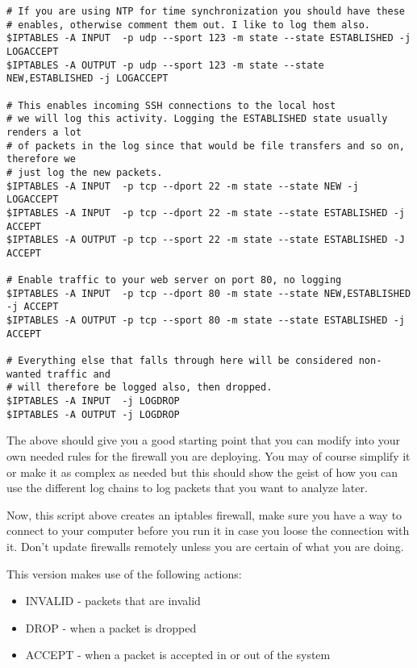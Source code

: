 \documentclass[english,twoside,openright,a4paper,12pt]{article}
\begin{document}
\begin{verbatim}
# If you are using NTP for time synchronization you should have these
# enables, otherwise comment them out. I like to log them also.
$IPTABLES -A INPUT  -p udp --sport 123 -m state --state ESTABLISHED -j LOGACCEPT 
$IPTABLES -A OUTPUT -p udp --sport 123 -m state --state NEW,ESTABLISHED -j LOGACCEPT

# This enables incoming SSH connections to the local host
# we will log this activity. Logging the ESTABLISHED state usually renders a lot 
# of packets in the log since that would be file transfers and so on, therefore we 
# just log the new packets.
$IPTABLES -A INPUT  -p tcp --dport 22 -m state --state NEW -j LOGACCEPT
$IPTABLES -A INPUT  -p tcp --dport 22 -m state --state ESTABLISHED -j ACCEPT 
$IPTABLES -A OUTPUT -p tcp --sport 22 -m state --state ESTABLISHED -J ACCEPT

# Enable traffic to your web server on port 80, no logging
$IPTABLES -A INPUT  -p tcp --dport 80 -m state --state NEW,ESTABLISHED -j ACCEPT 
$IPTABLES -A OUTPUT -p tcp --sport 80 -m state --state ESTABLISHED -j ACCEPT

# Everything else that falls through here will be considered non-wanted traffic and 
# will therefore be logged also, then dropped.
$IPTABLES -A INPUT  -j LOGDROP
$IPTABLES -A OUTPUT -j LOGDROP

\end{verbatim}

The above should give you a good starting point that you can modify into your own needed rules for the firewall you are deploying. You may of course simplify it or make it as complex as needed but this should show the geist of how you can use the different log chains to log packets that you want to analyze later.

Now, this script above creates an iptables firewall, make sure you have a way to connect to your computer before you run it in case you loose the connection with it. Don't update firewalls remotely unless you are certain of what you are doing.

This version makes use of the following actions:

\begin{itemize}
	\item INVALID - packets that are invalid
	\item DROP - when a packet is dropped
	\item ACCEPT - when a packet is accepted in or out of the system
\end{itemize}
\end{document}
